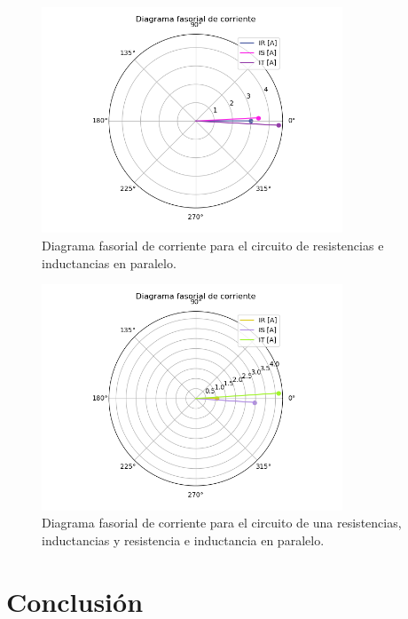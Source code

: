 \documentclass[a4paper]{article}
\begin{document}
\begin{figure}[H]
	\centering
	\includegraphics[width=0.8\textwidth]{Corriente-PARALELO}
\caption{Diagrama fasorial de corriente para el circuito de resistencias e inductancias en paralelo.}
	\label{fig:corriente-par}
\end{figure}

\begin{figure}[H]
	\centering
	\includegraphics[width=0.8\textwidth]{Corriente-RPARALELOL}
\caption{Diagrama fasorial de corriente para el circuito de una resistencias, inductancias y resistencia e inductancia en paralelo.}
	\label{fig:corriente-rlpar}
\end{figure}


\section*{Conclusión}
\end{document}
